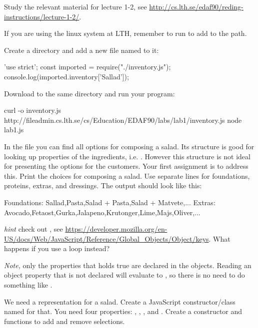 \documentclass[fleqn, article, a4paper]{memoir}
\begin{document}
\begin{Assignments}

\item Study the relevant material for lecture 1-2, see \url{http://cs.lth.se/edaf90/reding-instructions/lecture-1-2/}. 

\item If you are using the linux system at LTH, remember to run  to add  to the path.

\item Create a directory and add a new file named  to it:
\begin{Code}
'use strict';
const imported = require("./inventory.js");
console.log(imported.inventory['Sallad']);
\end{Code}
\noindent Download  to the same directory and run your  program:
\begin{Code}
curl -o inventory.js http://fileadmin.cs.lth.se/cs/Education/EDAF90/labs/lab1/inventory.js
node lab1.js
\end{Code}

\item In the  file you can find all options for composing a salad. Its structure is good for looking up properties of the ingredients, i.e. . However this structure is not ideal for presenting the options for the customers. Your first assignment is to address this. Print the choices for composing a salad. Use separate lines for foundations, proteins, extras, and dressings. The output should look like this:
\begin{Code}
Foundations: Sallad,Pasta,Salad + Pasta,Salad + Matvete,...
Extras: Avocado,Fetaost,Gurka,Jalapeno,Krutonger,Lime,Majs,Oliver,...
\end{Code}
\emph{hint} check out , see \url{https://developer.mozilla.org/en-US/docs/Web/JavaScript/Reference/Global_Objects/Object/keys}. What happens if you use a  loop instead?

\noindent \emph{Note,} only the properties that holds true are declared in the objects. Reading an object property that is not declared will evaluate to , so there is no need to do something like .

\item We need a representation for a salad. Create a JavaScript constructor/class named  for that. You need four properties: , , , and . Create a constructor and functions to add and remove selections.


\end{Assignments}
\end{document}
